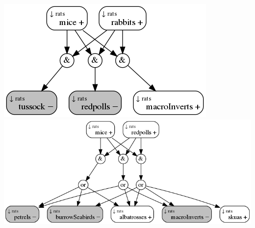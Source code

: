 \documentclass[11pt]{article}
\makeatletter
\def\maxwidth{\ifdim\Gin@nat@width>\linewidth\linewidth
    \else\Gin@nat@width\fi}
\let\Oldincludegraphics\includegraphics
\renewcommand{\includegraphics}[1]{\Oldincludegraphics[width=.8\maxwidth]{#1}}
\makeatother
\begin{document}
\includegraphics{PCUList8_1.png} \includegraphics{PCUList9_1.png}


    
    
    
    
\end{document}
